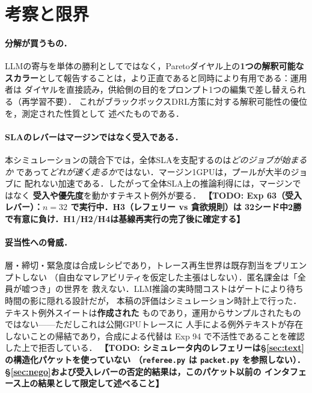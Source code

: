 \documentclass[uplatex,twocolumn,fontsize=9pt,paper=a4]{jlreq}
\newcommand{\todo}[1]{\textbf{【TODO: #1】}}
\begin{document}
\section{考察と限界}
\paragraph{分解が買うもの．}
LLMの寄与を単体の勝利としてではなく，Paretoダイヤル上の\textbf{1つの解釈可能な
スカラー}として報告することは，より正直であると同時により有用である：運用者は
ダイヤルを直接読み，供給側の目的をプロンプト1つの編集で差し替えられる（再学習不要）．
これがブラックボックスDRL方策に対する解釈可能性の優位を，測定された性質として
述べたものである．

\paragraph{SLAのレバーはマージンではなく受入である．}
本シミュレーションの競合下では，全体SLAを支配するのは\textit{どのジョブが始まるか}
であって\textit{どれが速く走るか}ではない．マージン1GPUは，プールが大半のジョブに
配れない加速である．したがって全体SLA上の推論利得には，マージンではなく
\textbf{受入や優先度}を動かすテキスト例外が要る．
\todo{Exp 63（受入レバー）：$n=32$ で実行中．H3（レフェリー vs 貪欲規則）は
32シード中2勝で\textbf{有意に負け}．H1/H2/H4は基線再実行の完了後に確定する}

\paragraph{妥当性への脅威．}
層・締切・緊急度は合成レシピであり，トレース再生世界は既存割当をプリエンプトしない
（自由なマレアビリティを仮定した主張はしない）．匿名課金は「全員が嘘つき」の世界を
救えない．LLM推論の実時間コストはゲートにより待ち時間の影に隠れる設計だが，
本稿の評価はシミュレーション時計上で行った．テキスト例外スイートは\textbf{作成された}
ものであり，運用からサンプルされたものではない——ただしこれは公開GPUトレースに
人手による例外テキストが存在しないことの帰結であり，合成による代替は
Exp 94 で不活性であることを確認した上で拒否している．
\todo{シミュレータ内のレフェリーは\S\ref{sec:text}の構造化パケットを使っていない
（\texttt{referee.py} は \texttt{packet.py} を参照しない）．
\S\ref{sec:nego}および受入レバーの否定的結果は，この\textbf{パケット以前の
インタフェース}上の結果として限定して述べること}

\end{document}

